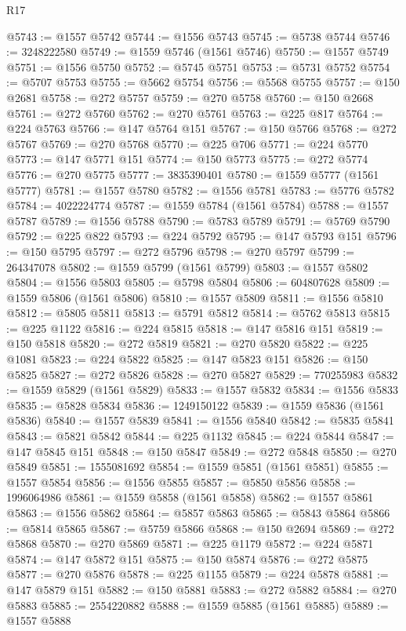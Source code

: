 \begin{lexlean}{R17}
\begin{coremodule}
@5743 := @1557 @5742
@5744 := @1556 @5743
@5745 := @5738 @5744
@5746 := 3248222580
@5749 := @1559 @5746 (@1561 @5746)
@5750 := @1557 @5749
@5751 := @1556 @5750
@5752 := @5745 @5751
@5753 := @5731 @5752
@5754 := @5707 @5753
@5755 := @5662 @5754
@5756 := @5568 @5755
@5757 := @150 @2681
@5758 := @272 @5757
@5759 := @270 @5758
@5760 := @150 @2668
@5761 := @272 @5760
@5762 := @270 @5761
@5763 := @225 @817
@5764 := @224 @5763
@5766 := @147 @5764 @151
@5767 := @150 @5766
@5768 := @272 @5767
@5769 := @270 @5768
@5770 := @225 @706
@5771 := @224 @5770
@5773 := @147 @5771 @151
@5774 := @150 @5773
@5775 := @272 @5774
@5776 := @270 @5775
@5777 := 3835390401
@5780 := @1559 @5777 (@1561 @5777)
@5781 := @1557 @5780
@5782 := @1556 @5781
@5783 := @5776 @5782
@5784 := 4022224774
@5787 := @1559 @5784 (@1561 @5784)
@5788 := @1557 @5787
@5789 := @1556 @5788
@5790 := @5783 @5789
@5791 := @5769 @5790
@5792 := @225 @822
@5793 := @224 @5792
@5795 := @147 @5793 @151
@5796 := @150 @5795
@5797 := @272 @5796
@5798 := @270 @5797
@5799 := 264347078
@5802 := @1559 @5799 (@1561 @5799)
@5803 := @1557 @5802
@5804 := @1556 @5803
@5805 := @5798 @5804
@5806 := 604807628
@5809 := @1559 @5806 (@1561 @5806)
@5810 := @1557 @5809
@5811 := @1556 @5810
@5812 := @5805 @5811
@5813 := @5791 @5812
@5814 := @5762 @5813
@5815 := @225 @1122
@5816 := @224 @5815
@5818 := @147 @5816 @151
@5819 := @150 @5818
@5820 := @272 @5819
@5821 := @270 @5820
@5822 := @225 @1081
@5823 := @224 @5822
@5825 := @147 @5823 @151
@5826 := @150 @5825
@5827 := @272 @5826
@5828 := @270 @5827
@5829 := 770255983
@5832 := @1559 @5829 (@1561 @5829)
@5833 := @1557 @5832
@5834 := @1556 @5833
@5835 := @5828 @5834
@5836 := 1249150122
@5839 := @1559 @5836 (@1561 @5836)
@5840 := @1557 @5839
@5841 := @1556 @5840
@5842 := @5835 @5841
@5843 := @5821 @5842
@5844 := @225 @1132
@5845 := @224 @5844
@5847 := @147 @5845 @151
@5848 := @150 @5847
@5849 := @272 @5848
@5850 := @270 @5849
@5851 := 1555081692
@5854 := @1559 @5851 (@1561 @5851)
@5855 := @1557 @5854
@5856 := @1556 @5855
@5857 := @5850 @5856
@5858 := 1996064986
@5861 := @1559 @5858 (@1561 @5858)
@5862 := @1557 @5861
@5863 := @1556 @5862
@5864 := @5857 @5863
@5865 := @5843 @5864
@5866 := @5814 @5865
@5867 := @5759 @5866
@5868 := @150 @2694
@5869 := @272 @5868
@5870 := @270 @5869
@5871 := @225 @1179
@5872 := @224 @5871
@5874 := @147 @5872 @151
@5875 := @150 @5874
@5876 := @272 @5875
@5877 := @270 @5876
@5878 := @225 @1155
@5879 := @224 @5878
@5881 := @147 @5879 @151
@5882 := @150 @5881
@5883 := @272 @5882
@5884 := @270 @5883
@5885 := 2554220882
@5888 := @1559 @5885 (@1561 @5885)
@5889 := @1557 @5888

\end{coremodule}
\end{lexlean}
